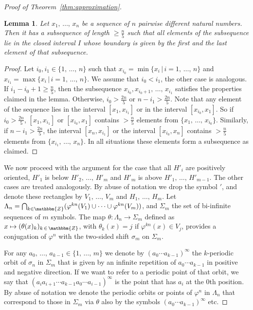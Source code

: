 \documentclass[10pt,a4paper]{amsart}
\numberwithin{equation}{section}
\newcommand{\Z}{\mathbbm{Z}}
\newtheorem{lemm}[theo]{Lemma}
\theoremstyle{definition}
\theoremstyle{remark}
\begin{document}
\begin{proof}[Proof of Theorem~\ref{thm:approximation}]
\begin{lemm}
Let $x_1, \,\ldots,\, x_n$ be a sequence of $n$ pairwise different natural numbers. Then it has a subsequence of length $\geq \frac{n}{5}$ such that all elements of the subsequence lie in the closed interval $I$ whose boundary is given by the first and the last element of that subsequence.
\end{lemm}

\begin{proof}
Let $i_0, i_1 \in \{1, \,\ldots,\, n\}$ such that $x_{i_0} = \min \{ x_i \, | \, i = 1,\, \ldots,\, n \}$ and $x_{i_1} = \max \{ x_i \, | \, i = 1,\, \ldots,\, n\}$. We assume that $i_0 < i_1$, the other case is analogous. If $i_1 -i_0 + 1 \geq \frac{n}{5}$, then the subsequence $x_{i_0}, x_{i_0 + 1}, \,\ldots,\, x_{i_1}$ satisfies the properties claimed in the lemma. Otherwise, $i_0> \frac{2n}{5}$ or $n-i_1 > \frac{2n}{5}$. Note that any element of the sequence lies in the interval $[x_1,x_{i_1}]$ or in the interval $[x_{i_0}, x_1]$. So if $i_0>\frac{2n}{5}$, $[x_1,x_{i_1}]$ or $[x_{i_0}, x_1]$ contains $> \frac{n}{5}$ elements from $\{x_1, \,\ldots,\, x_{i_0}\}$. Similarly, if $n-i_1 > \frac{2n}{5}$, the interval $[x_n, x_{i_1}]$ or the interval $[x_{i_0}, x_n]$ contains $> \frac{n}{5}$ elements from $\{x_{i_1},\,\ldots,\, x_{n}\}$. In all situations these elements form a subsequence as claimed.
\end{proof}

We now proceed with the argument for the case that all $H'_i$ are positively oriented, $H'_1$ is below $H'_2, \,\ldots,\, H'_{m}$ and $H'_m$ is above $H'_1, \,\ldots,\, H'_{m-1}$. The other cases are treated analogously. By abuse of notation we drop the symbol $'$, and denote these rectangles by $V_1, \,\ldots,\, V_m$ and $H_1,\, \ldots,\, H_m$. Let $\Lambda_n = \bigcap_{k\in \Z} (\varphi^{kn}(V_1) \cup \cdots \cup \varphi^{kn}(V_{m}))$, and $\Sigma_m$ the set of bi-infinite sequences of $m$ symbols. The map $\theta: \Lambda_n \to \Sigma_m$ defined as $x \mapsto (\theta(x)_k)_{k\, \in\, \Z}$, with $\theta_k(x) = j$ if $\varphi^{kn}(x) \in V_j$, provides a conjugation of $\varphi^n$ with the two-sided shift $\sigma_m$ on $\Sigma_m$.

For any $a_0,\, \ldots,\, a_{k-1} \in \{1, \,\ldots,\, m\}$ we denote by $(a_0\cdots a_{k-1})^{\infty}$ the  $k$-periodic orbit of $\sigma_n$ in $\Sigma_m$ that is given by an infinite repetition of $a_0\cdots a_{k-1}$ in positive and negative direction. If we want to refer to a periodic point of that orbit, we say that $(a_i a_{i+1} \cdots a_{k-1} a_0 \cdots a_{i-1})^{\infty}$ is the point that has $a_i$ at the $0$th position. By abuse of notation we denote the periodic orbits or points of $\varphi^n$ in $\Lambda_n$ that correspond to those in $\Sigma_m$ via $\theta$ also by the symbols $(a_0\cdots a_{k-1})^{\infty}$ etc.


\end{proof}
\end{document}
